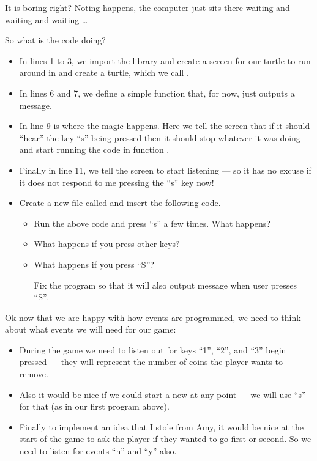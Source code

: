 \documentclass{coderdojo}
\newcommand\TODO[1]{
\begin{itemize}
\item[\todoSymbol] \color{todo} #1
\end{itemize}}
\begin{document}
It is boring right?  Noting happens, the computer just sits there waiting and waiting and waiting \ldots

So what is the code doing?
\begin{itemize}
\item
In lines 1 to 3, we import the  library and create a screen for our turtle to run around in and create a turtle, which we call .
\item
In lines 6 and 7, we define a simple function that, for now, just outputs a message.
\item
In line 9 is where the magic happens.  Here we tell the screen that if it should ``hear'' the key ``s'' being pressed then it should stop whatever it was doing and start running the code in function .

\item
Finally in line 11, we tell the screen to start listening --- so it has no excuse if it does not respond to me pressing the ``s'' key now! 
\end{itemize}

\TODO{Create a new file called  and insert the following code.

\begin{itemize}
\item
Run the above code and press ``s'' a few times. What happens?
\item
What happens if you press other keys?
\item
What happens if you press ``S''?  

Fix the program so that it will also output message when user presses ``S''.

\end{itemize}}

Ok now that we are happy with how events are programmed, we need to think about what events we will need for our game:

\begin{itemize}
\item During the game we need to listen out for keys ``1'', ``2'', and ``3'' begin pressed --- they will represent the number of coins the player wants to remove.
\item Also it would be nice if we could start a new at any point --- we will use ``s'' for that (as in our first program above).
\item Finally to implement an idea that I stole from Amy, it would be nice at the start of the game to ask the player if they wanted to go first or second.  So we need to listen for events ``n'' and ``y'' also. 
\end{itemize}
\end{document}
